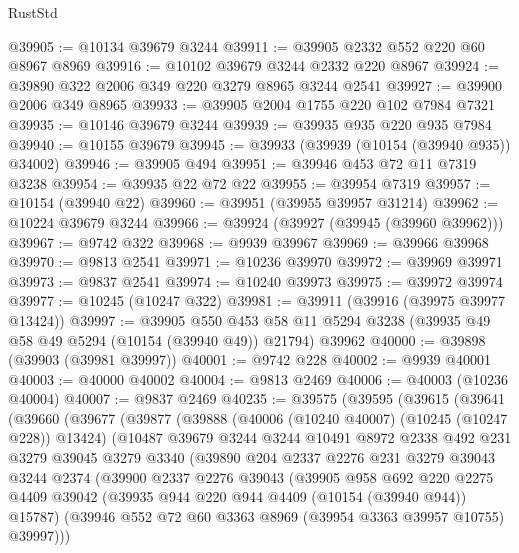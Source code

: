\begin{lexlean}{RustStd}
\begin{coremodule}
@39905 := @10134 @39679 @3244
@39911 := @39905 @2332 @552 @220 @60 @8967 @8969
@39916 := @10102 @39679 @3244 @2332 @220 @8967
@39924 := @39890 @322 @2006 @349 @220 @3279 @8965 @3244 @2541
@39927 := @39900 @2006 @349 @8965
@39933 := @39905 @2004 @1755 @220 @102 @7984 @7321
@39935 := @10146 @39679 @3244
@39939 := @39935 @935 @220 @935 @7984
@39940 := @10155 @39679
@39945 := @39933 (@39939 (@10154 (@39940 @935)) @34002)
@39946 := @39905 @494
@39951 := @39946 @453 @72 @11 @7319 @3238
@39954 := @39935 @22 @72 @22
@39955 := @39954 @7319
@39957 := @10154 (@39940 @22)
@39960 := @39951 (@39955 @39957 @31214)
@39962 := @10224 @39679 @3244
@39966 := @39924 (@39927 (@39945 (@39960 @39962)))
@39967 := @9742 @322
@39968 := @9939 @39967
@39969 := @39966 @39968
@39970 := @9813 @2541
@39971 := @10236 @39970
@39972 := @39969 @39971
@39973 := @9837 @2541
@39974 := @10240 @39973
@39975 := @39972 @39974
@39977 := @10245 (@10247 @322)
@39981 := @39911 (@39916 (@39975 @39977 @13424))
@39997 := @39905
    @550
    @453
    @58
    @11
    @5294
    @3238
    (@39935 @49 @58 @49 @5294 (@10154 (@39940 @49)) @21794)
    @39962
@40000 := @39898 (@39903 (@39981 @39997))
@40001 := @9742 @228
@40002 := @9939 @40001
@40003 := @40000 @40002
@40004 := @9813 @2469
@40006 := @40003 (@10236 @40004)
@40007 := @9837 @2469
@40235 := @39575
    (@39595
      (@39615
        (@39641
          (@39660
            (@39677
              (@39877
                (@39888
                  (@40006 (@10240 @40007) (@10245 (@10247 @228)) @13424)
                  (@10487
                    @39679
                    @3244
                    @3244
                    @10491
                    @8972
                    @2338
                    @492
                    @231
                    @3279
                    @39045
                    @3279
                    @3340
                    (@39890
                      @204
                      @2337
                      @2276
                      @231
                      @3279
                      @39043
                      @3244
                      @2374
                      (@39900
                        @2337
                        @2276
                        @39043
                        (@39905
                          @958
                          @692
                          @220
                          @2275
                          @4409
                          @39042
                          (@39935 @944 @220 @944 @4409 (@10154 (@39940 @944)) @15787)
                          (@39946 @552 @72 @60 @3363 @8969 (@39954 @3363 @39957 @10755) @39997)))

\end{coremodule}
\end{lexlean}
